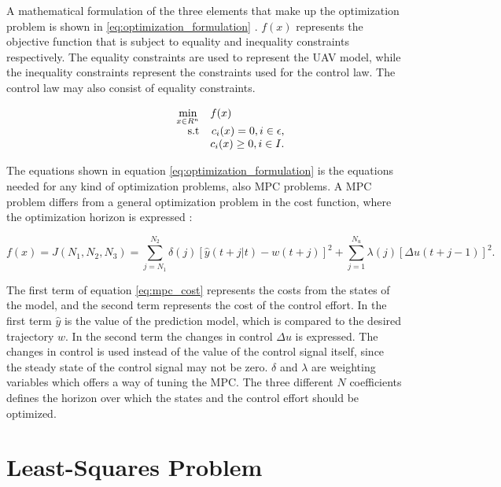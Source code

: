 A mathematical formulation of the three elements that make up the optimization problem is shown in \ref{eq:optimization_formulation} \cite{nocedalOPTIMIZATION}. $f(x)$ represents the objective function that is subject to equality and inequality constraints respectively. The equality constraints are used to represent the UAV model, while the inequality constraints represent the constraints used for the control law. The control law may also consist of equality constraints.

\begin{equation}
	\label{eq:optimization_formulation}
	\begin{array}{rrclcl}
		\displaystyle \min_{x \in R^n} & \multicolumn{3}{l}{f(x)} \\
		\textrm{s.t}
		& c_i(x) = 0, i \in \epsilon, \\
		& c_i(x) \geq 0, i \in I.
	\end{array}
\end{equation}

The equations shown in equation \ref{eq:optimization_formulation} is the equations needed for any kind of optimization problems, also MPC problems. A MPC problem differs from a general optimization problem in the cost function, where the optimization horizon is expressed \cite{mpcCAMACHO}:

\begin{equation}
	\label{eq:mpc_cost}
	f(x) = J(N_1, N_2, N_3) = \sum_{j=N_1}^{N_2} \delta(j)[\hat{y}(t+j|t)-w(t+j)]^2 + 
	\sum_{j=1}^{N_u}\lambda(j)[\Delta u(t+j-1)]^2.
\end{equation}

The first term of equation \ref{eq:mpc_cost} represents the costs from the states of the model, and the second term represents the cost of the control effort. In the first term $\hat{y}$ is the value of the prediction model, which is compared to the desired trajectory $w$. In the second term the changes in control $\Delta u$ is expressed. The changes in control is used instead of the value of the control signal itself, since the steady state of the control signal may not be zero. $\delta$ and $\lambda$ are weighting variables which offers a way of tuning the MPC. The three different $N$ coefficients defines the horizon over which the states and the control effort should be optimized.

\section{Least-Squares Problem}

